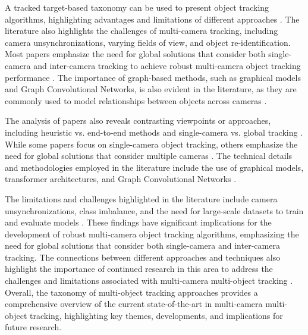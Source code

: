\documentclass[conference]{IEEEtran}
\begin{document}
A tracked target-based taxonomy can be used to present object tracking algorithms, highlighting advantages and limitations of different approaches \cite{Object Tracking in Videos: Approaches and Issues}. The literature also highlights the challenges of multi-camera tracking, including camera unsynchronizations, varying fields of view, and object re-identification. Most papers emphasize the need for global solutions that consider both single-camera and inter-camera tracking to achieve robust multi-camera object tracking performance \cite{An equalised global graphical model-based approach for multi-camera object tracking}. The importance of graph-based methods, such as graphical models and Graph Convolutional Networks, is also evident in the literature, as they are commonly used to model relationships between objects across cameras \cite{Graph Convolutional Network for Multi-Target Multi-Camera Vehicle Tracking}.

The analysis of papers also reveals contrasting viewpoints or approaches, including heuristic vs. end-to-end methods and single-camera vs. global tracking \cite{Multi-Camera Tracking Transformer}. While some papers focus on single-camera object tracking, others emphasize the need for global solutions that consider multiple cameras \cite{An equalised global graphical model-based approach for multi-camera object tracking}. The technical details and methodologies employed in the literature include the use of graphical models, transformer architectures, and Graph Convolutional Networks \cite{Graph Convolutional Network for Multi-Target Multi-Camera Vehicle Tracking}. 

The limitations and challenges highlighted in the literature include camera unsynchronizations, class imbalance, and the need for large-scale datasets to train and evaluate models \cite{Graph Convolutional Network for Multi-Target Multi-Camera Vehicle Tracking}. These findings have significant implications for the development of robust multi-camera object tracking algorithms, emphasizing the need for global solutions that consider both single-camera and inter-camera tracking. The connections between different approaches and techniques also highlight the importance of continued research in this area to address the challenges and limitations associated with multi-camera multi-object tracking \cite{Object Tracking in Videos: Approaches and Issues}. Overall, the taxonomy of multi-object tracking approaches provides a comprehensive overview of the current state-of-the-art in multi-camera multi-object tracking, highlighting key themes, developments, and implications for future research.
\end{document}
